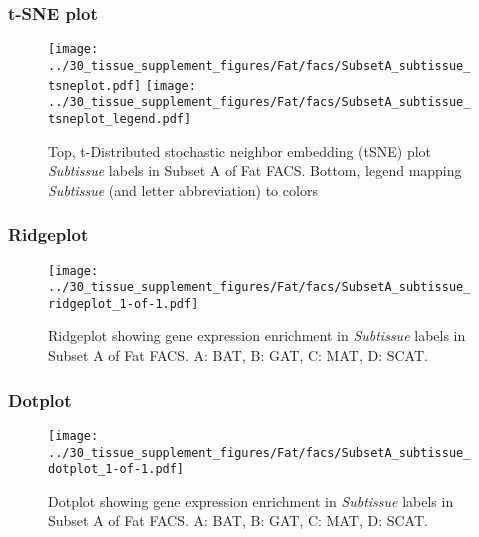 \clearpage
\subsubsection{t-SNE plot}
\begin{figure}[h]
\centering
\texttt{[image: ../30\_tissue\_supplement\_figures/Fat/facs/SubsetA\_subtissue\_tsneplot.pdf]}
\texttt{[image: ../30\_tissue\_supplement\_figures/Fat/facs/SubsetA\_subtissue\_tsneplot\_legend.pdf]}
\caption{Top, t-Distributed stochastic neighbor embedding (tSNE) plot  \emph{Subtissue} labels in Subset A of Fat FACS. Bottom, legend mapping \emph{Subtissue} (and letter abbreviation) to colors}
\end{figure}


\clearpage

\subsubsection{Ridgeplot}
\begin{figure}[h]
\centering
\texttt{[image: ../30\_tissue\_supplement\_figures/Fat/facs/SubsetA\_subtissue\_ridgeplot\_1-of-1.pdf]}

\caption{ Ridgeplot  showing gene expression enrichment in \emph{Subtissue} labels in Subset A of Fat FACS. A: BAT, B: GAT, C: MAT, D: SCAT.}
\end{figure}


\clearpage

\subsubsection{Dotplot}
\begin{figure}[h]
\centering
\texttt{[image: ../30\_tissue\_supplement\_figures/Fat/facs/SubsetA\_subtissue\_dotplot\_1-of-1.pdf]}

\caption{ Dotplot  showing gene expression enrichment in \emph{Subtissue} labels in Subset A of Fat FACS. A: BAT, B: GAT, C: MAT, D: SCAT.}
\end{figure}

